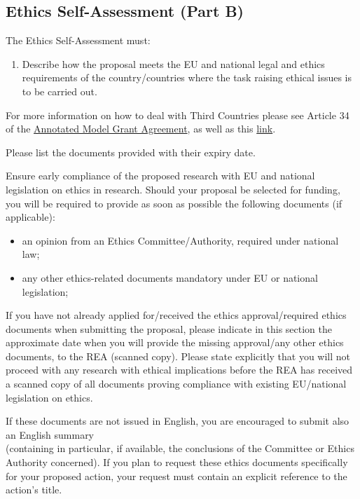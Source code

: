 \documentclass[a4paper,11pt]{article}
\begin{document}
\subsection*{Ethics Self-Assessment (Part B)}

The Ethics Self-Assessment must:
\begin{enumerate}
\item Describe how the proposal meets the EU and national legal and ethics requirements of the country/countries where the task raising ethical issues is to be carried out.
\end{enumerate}

For more information on how to deal with Third Countries please see Article 34 of the \href{http://ec.europa.eu/research/participants/data/ref/h2020/grants_manual/amga/h2020-amga_en.pdf}{Annotated Model Grant Agreement}, as well as this \href{http://ec.europa.eu/justice/data-protection/international-transfers/adequacy/index_en.htm}{link}.

Please list the documents provided with their expiry date.

Ensure early compliance of the proposed research with EU and national legislation on ethics in research. Should your proposal be selected for funding, you will be required to provide as soon as possible the following documents (if applicable):

\begin{itemize}
\item an opinion from an Ethics Committee/Authority, required under national law;
\item any other ethics-related documents mandatory under EU or national legislation;
\end{itemize}

If you have not already applied for/received the ethics approval/required ethics documents when submitting the proposal, please indicate in this section the approximate date when you will provide the missing approval/any other ethics documents, to the REA (scanned copy). Please state explicitly that you will not proceed with any research with ethical implications before the REA has received a scanned copy of all documents proving compliance with existing EU/national legislation on ethics.

\begin{framed}
\noindent If these documents are not issued in English, you are encouraged to submit also an English summary\\
(containing in particular, if available, the conclusions of the Committee or Ethics Authority concerned). 
If you plan to request these ethics documents specifically for your proposed action, your request must contain an explicit reference to the action's title.
\end{framed}
\end{document}
